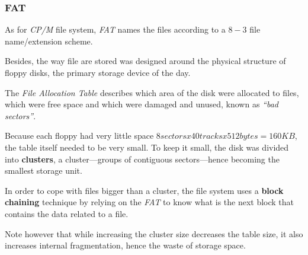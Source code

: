 
\begin{frame}
  \frametitle{FAT}

  As for \textit{CP/M} file system, \textit{FAT} names the files according
  to a $8-3$ file name/extension scheme.

  \-

  Besides, the way file are stored was designed around the physical structure
  of floppy disks, the primary storage device of the day.

  \-

  The \textit{File Allocation Table} describes which area of the disk were
  allocated to files, which were free space and which were damaged and
  unused, known as \textit{``bad sectors''}.

  \-

  Because each floppy had very little space \ie{} $8 sectors x 40 tracks x
  512 bytes = 160 KB$, the table itself needed to be very small. To keep it
  small, the disk was divided into \textbf{clusters}, a cluster---groups
  of contiguous sectors---hence becoming the smallest storage unit.

  \-

  In order to cope with files bigger than a cluster, the file system uses
  a \textbf{block chaining} technique by relying on the \textit{FAT} to
  know what is the next block that contains the data related to a file.

  \-

  Note however that while increasing the cluster size decreases the table
  size, it also increases internal fragmentation, hence the waste of
  storage space.
\end{frame}



